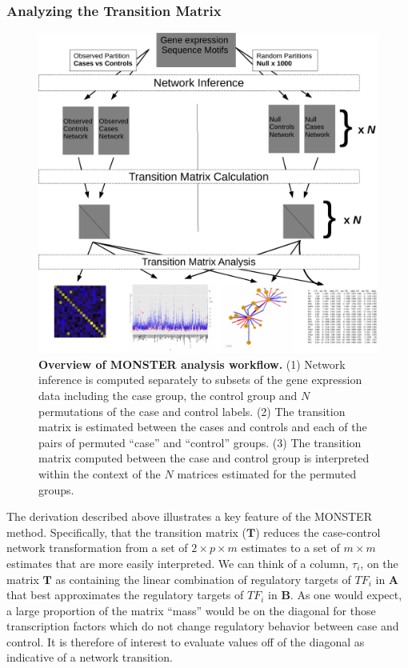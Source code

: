 \subsubsection*{Analyzing the Transition Matrix}

\begin{figure}
\centering{}\includegraphics[width=1\columnwidth]{figures/SupportingFigure1}\caption[Overview of MONSTER analysis workflow]{\textbf{Overview of MONSTER analysis workflow.} (1) Network inference is computed separately to subsets of the gene expression data including the case group, the control group and $N$ permutations of the case and control labels. (2) The transition matrix is estimated between the cases and controls and each of the pairs of permuted ``case'' and ``control'' groups. (3) The transition matrix computed between the case and control group is interpreted within the context of the $N$ matrices estimated for the permuted groups.}
\label{fig:Supplement_workflow}
\end{figure}

The derivation described above illustrates a key feature of the MONSTER method. Specifically, that the transition matrix ($\mathbf{T}$) reduces the case-control network transformation from a set of $2\times p\times m$ estimates to a set of $m\times m$ estimates that are more easily interpreted. We can think of a column, $\tau_{i}$, on the matrix $\mathbf{T}$ as containing the linear combination of regulatory targets of $TF_{i}$ in $\mathbf{A}$ that best approximates the regulatory targets of $TF_{i}$ in $\mathbf{B}$. As one would expect, a large proportion of the matrix ``mass'' would be on the diagonal for those transcription factors which do not change regulatory behavior between case and control. It is therefore of interest to evaluate values off of the diagonal as indicative of a network transition.

